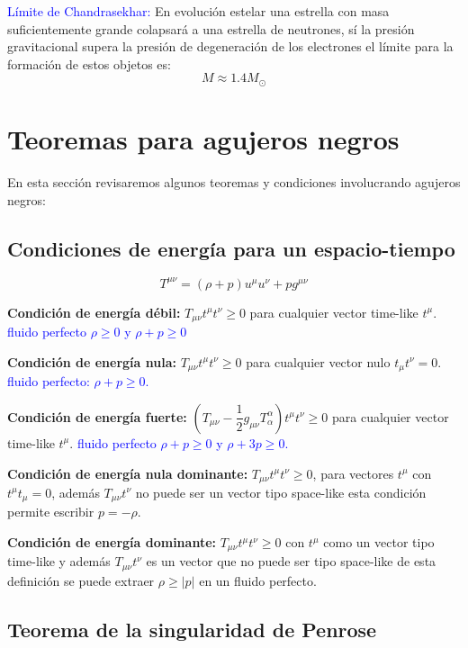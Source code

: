 \documentclass[../main]{subfiles}
\begin{document}
\begin{adjustwidth}{0pt}{-100pt}
\textcolor{blue}{Límite de Chandrasekhar:} En evolución estelar una estrella con masa suficientemente grande colapsará a una estrella de neutrones, sí la presión gravitacional supera la presión de degeneración de los electrones el límite para la formación de estos objetos es:
\begin{equation}
    M \approx 1.4M_{\odot}
\end{equation}

\section{Teoremas para agujeros negros}\label{part6.7}

En esta sección revisaremos algunos teoremas y condiciones involucrando agujeros negros:

\subsection{Condiciones de energía para un espacio-tiempo}
\begin{equation}
    T^{\mu\nu}=(\rho+p)u^{\mu}u^{\nu}+pg^{\mu\nu}
\end{equation}

\textbf{Condición de energía débil:} $T_{\mu\nu}t^{\mu}t^{\nu}\geq 0$ para cualquier vector time-like $t^{\mu}$. \textcolor{blue}{fluido perfecto $\rho\geq 0$ y $\rho+p\geq 0$}

\textbf{Condición de energía nula:} $T_{\mu\nu}t^{\mu}t^{\nu}\geq 0$ para cualquier vector nulo $t_{\mu}t^{\nu}=0$. \textcolor{blue}{fluido perfecto: $\rho+p\geq 0$.}

\textbf{Condición de energía fuerte:} $\displaystyle \left(T_{\mu\nu}-\dfrac{1}{2}g_{\mu\nu}T^{\alpha}_{\alpha}\right)t^{\mu} t^{\nu} \geq 0$ para cualquier vector time-like $t^{\mu}$. \textcolor{blue}{fluido perfecto $\rho+p\geq 0$ y $\rho+3p\geq 0$.}

\textbf{Condición de energía nula dominante:} $T_{\mu\nu}t^{\mu}t^{\nu}\geq 0$, para vectores $t^{\mu}$ con $t^{\mu}t_{\mu}=0$, además $T_{\mu\nu}t^{\nu}$ no puede ser un vector tipo space-like esta condición permite escribir $p=-\rho$.

\textbf{Condición de energía dominante:} $T_{\mu\nu}t^{\mu}t^{\nu}\geq 0$ con $t^{\mu}$ como un vector tipo time-like y además $T_{\mu\nu}t^{\nu}$ es un vector que no puede ser tipo space-like de esta definición se puede extraer $\rho \geq |p|$ en un fluido perfecto.

\subsection{Teorema de la singularidad de Penrose}


\end{adjustwidth}
\end{document}
